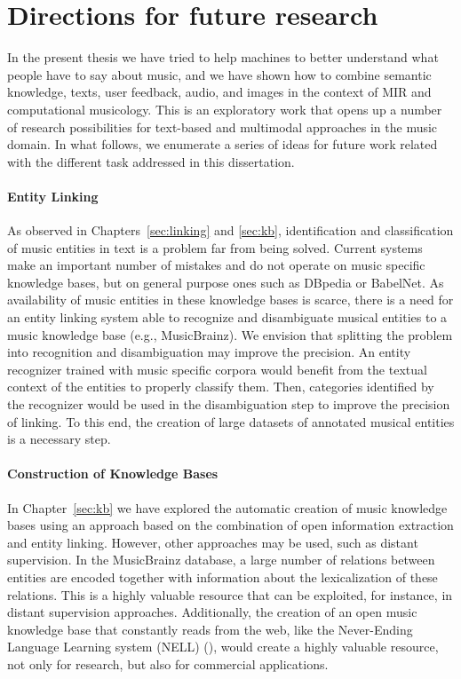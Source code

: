 \section{Directions for future research}
\label{sec:conclusion:future}

In the present thesis we have tried to help machines to better understand what people have to say about music, and we have shown how to combine semantic knowledge, texts, user feedback, audio, and images in the context of MIR and computational musicology. This is an exploratory work that opens up a number of research possibilities for text-based and multimodal approaches in the music domain. In what follows, we enumerate a series of ideas for future work related with the different task addressed in this dissertation.

\paragraph{Entity Linking} As observed in Chapters~\ref{sec:linking} and \ref{sec:kb}, identification and classification of music entities in text is a problem far from being solved. Current systems make an important number of mistakes and do not operate on music specific knowledge bases, but on general purpose ones such as DBpedia or BabelNet. As availability of music entities in these knowledge bases is scarce, there is a need for an entity linking system able to recognize and disambiguate musical entities to a music knowledge base (e.g., MusicBrainz). We envision that splitting the problem into recognition and disambiguation may improve the precision. An entity recognizer trained with music specific corpora would benefit from the textual context of the entities to properly classify them. Then, categories identified by the recognizer would be used in the disambiguation step to improve the precision of linking. To this end, the creation of large datasets of annotated musical entities is a necessary step. %

\paragraph{Construction of Knowledge Bases} In Chapter~\ref{sec:kb} we have explored the automatic creation of music knowledge bases using an approach based on the combination of open information extraction and entity linking. However, other approaches may be used, such as distant supervision. In the MusicBrainz database,  a large number of relations between entities are encoded together with information about the lexicalization of these relations. This is a highly valuable resource that can be exploited, for instance, in distant supervision approaches. Additionally, the creation of an open music knowledge base that constantly reads from the web, like the Never-Ending Language Learning system (NELL) (\cite{Carlson2010a}), would create a highly valuable resource, not only for research, but also for commercial applications.


